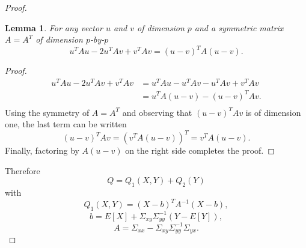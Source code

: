 \documentclass{article}
\newtheorem{lem}[thm]{Lemma}
\theoremstyle{definition}
\theoremstyle{remark}
\begin{document}
\begin{proof}
\begin{lem}
For any vector $u$ and $v$ of dimension $p$ and a symmetric matrix $A=A^T$ of dimension $p$-by-$p$
\begin{equation*}
u^TAu-2u^TAv+v^TAv=(u-v)^TA(u-v).
\end{equation*}
\end{lem}
\begin{proof}
\begin{align*}
u^TAu-2u^TAv+v^TAv&=u^TAu-u^TAv-u^TAv+v^TAv\\
&=u^TA(u-v)-(u-v)^TAv.\\
\end{align*}
Using the symmetry of $A=A^T$ and observing that $(u-v)^TAv$ is of dimension one, the last term can be written
\begin{equation*}
(u-v)^TAv=(v^TA(u-v))^T=v^TA(u-v).
\end{equation*}
Finally, factoring by $A(u-v)$ on the right side completes the proof.
\end{proof}

Therefore
$$Q=Q_1(X,Y)+Q_2(Y)$$
with
$$Q_1(X,Y)=(X-b)^TA^{-1}(X-b),$$
$$b=E[X]+\Sigma_{xy}\Sigma_{yy}^{-1}(Y-E[Y]),$$
$$A=\Sigma_{xx}-\Sigma_{xy}\Sigma_{yy}^{-1}\Sigma_{yx}.$$


\end{proof}
\end{document}
